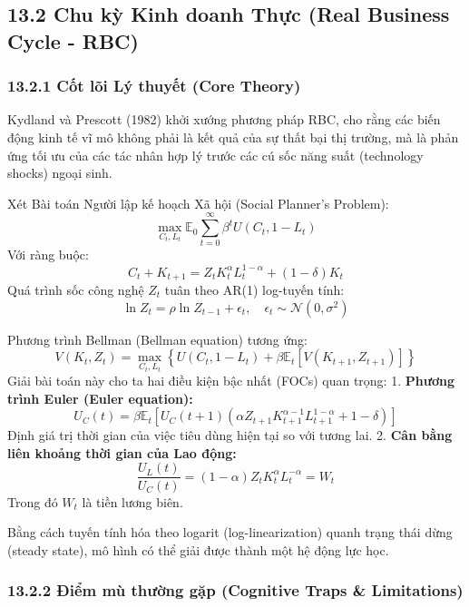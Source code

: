\documentclass[
]{article}
\begin{document}
\subsection{13.2 Chu kỳ Kinh doanh Thực (Real Business Cycle -
RBC)}\label{chu-kux1ef3-kinh-doanh-thux1ef1c-real-business-cycle---rbc}

\subsubsection{13.2.1 Cốt lõi Lý thuyết (Core
Theory)}\label{cux1ed1t-luxf5i-luxfd-thuyux1ebft-core-theory-40}

Kydland và Prescott (1982) khởi xướng phương pháp RBC, cho rằng các biến
động kinh tế vĩ mô không phải là kết quả của sự thất bại thị trường, mà
là phản ứng tối ưu của các tác nhân hợp lý trước các cú sốc năng suất
(technology shocks) ngoại sinh.

Xét Bài toán Người lập kế hoạch Xã hội (Social Planner's Problem):
\[ \max_{C_t, L_t} \mathbb{E}_0 \sum_{t=0}^\infty \beta^t U(C_t, 1 - L_t) \]
Với ràng buộc:
\[ C_t + K_{t+1} = Z_t K_t^\alpha L_t^{1-\alpha} + (1-\delta) K_t \] Quá
trình sốc công nghệ \(Z_t\) tuân theo AR(1) log-tuyến tính:
\[ \ln Z_t = \rho \ln Z_{t-1} + \epsilon_t, \quad \epsilon_t \sim \mathcal{N}(0, \sigma^2) \]

Phương trình Bellman (Bellman equation) tương ứng:
\[ V(K_t, Z_t) = \max_{C_t, L_t} \left\{ U(C_t, 1-L_t) + \beta \mathbb{E}_t [V(K_{t+1}, Z_{t+1})] \right\} \]
Giải bài toán này cho ta hai điều kiện bậc nhất (FOCs) quan trọng: 1.
\textbf{Phương trình Euler (Euler equation):}
\[ U_C(t) = \beta \mathbb{E}_t \left[ U_C(t+1) \left( \alpha Z_{t+1} K_{t+1}^{\alpha-1} L_{t+1}^{1-\alpha} + 1 - \delta \right) \right] \]
Định giá trị thời gian của việc tiêu dùng hiện tại so với tương lai. 2.
\textbf{Cân bằng liên khoảng thời gian của Lao động:}
\[ \frac{U_L(t)}{U_C(t)} = (1-\alpha) Z_t K_t^\alpha L_t^{-\alpha} = W_t \]
Trong đó \(W_t\) là tiền lương biên.

Bằng cách tuyến tính hóa theo logarit (log-linearization) quanh trạng
thái dừng (steady state), mô hình có thể giải được thành một hệ động lực
học.

\subsubsection{13.2.2 Điểm mù thường gặp (Cognitive Traps \&
Limitations)}\label{ux111iux1ec3m-muxf9-thux1b0ux1eddng-gux1eb7p-cognitive-traps-limitations-91}
\end{document}
